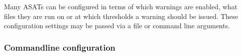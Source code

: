 \documentclass{seal_article}
\begin{document}
Many ASATs can be configured in terms of which warnings are enabled, what files they are run on or at which thresholds a warning should be issued. These configuration settings may be passed via a file or command line arguments.

\subsubsection{Commandline configuration}





\end{document}
